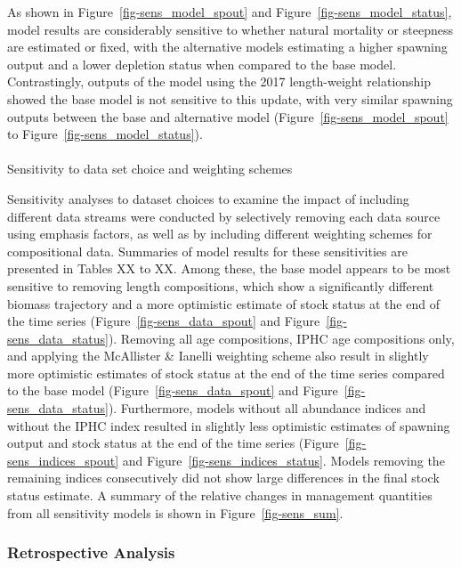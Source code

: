 \documentclass[
]{scrartcl}
\makeatletter
\let\oldparagraph\paragraph
\renewcommand{\paragraph}{
    \@ifstar
      \xxxParagraphStar
      \xxxParagraphNoStar
  }
\newcommand{\xxxParagraphStar}[1]{\oldparagraph*{#1}\mbox{}}
\newcommand{\xxxParagraphNoStar}[1]{\oldparagraph{#1}\mbox{}}
\makeatother
\begin{document}
As shown in Figure~\ref{fig-sens_model_spout} and
Figure~\ref{fig-sens_model_status}, model results are considerably
sensitive to whether natural mortality or steepness are estimated or
fixed, with the alternative models estimating a higher spawning output
and a lower depletion status when compared to the base model.
Contrastingly, outputs of the model using the 2017 length-weight
relationship showed the base model is not sensitive to this update, with
very similar spawning outputs between the base and alternative model
(Figure~\ref{fig-sens_model_spout} to
Figure~\ref{fig-sens_model_status}).

\paragraph{Sensitivity to data set choice and weighting
schemes}\label{sensitivity-to-data-set-choice-and-weighting-schemes}

Sensitivity analyses to dataset choices to examine the impact of
including different data streams were conducted by selectively removing
each data source using emphasis factors, as well as by including
different weighting schemes for compositional data. Summaries of model
results for these sensitivities are presented in Tables XX to XX. Among
these, the base model appears to be most sensitive to removing length
compositions, which show a significantly different biomass trajectory
and a more optimistic estimate of stock status at the end of the time
series (Figure~\ref{fig-sens_data_spout} and
Figure~\ref{fig-sens_data_status}). Removing all age compositions, IPHC
age compositions only, and applying the McAllister \& Ianelli weighting
scheme also result in slightly more optimistic estimates of stock status
at the end of the time series compared to the base model
(Figure~\ref{fig-sens_data_spout} and
Figure~\ref{fig-sens_data_status}). Furthermore, models without all
abundance indices and without the IPHC index resulted in slightly less
optimistic estimates of spawning output and stock status at the end of
the time series (Figure~\ref{fig-sens_indices_spout} and
Figure~\ref{fig-sens_indices_status}. Models removing the remaining
indices consecutively did not show large differences in the final stock
status estimate. A summary of the relative changes in management
quantities from all sensitivity models is shown in
Figure~\ref{fig-sens_sum}.

\subsubsection{Retrospective Analysis}\label{retrospective-analysis}
\end{document}
